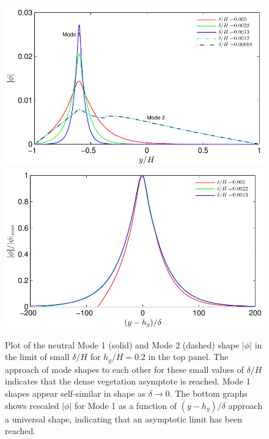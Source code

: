 \documentclass[12pt]{report}   %
\newcommand{\hg}{h_g}
\newcommand{\Rey}{{R}}
\newcommand{\Ndg}{\tilde{N}_g}
\begin{document}
\begin{figure}
{\includegraphics[scale=1.1]{Asymptotic_noshear}}\\
 \includegraphics[scale=1.1]{Asymptotic_noshear2}
\caption{
Plot of the neutral Mode 1 (solid) and Mode 2 (dashed) shape $|\phi|$ in the limit of small $\delta/H$ for $\hg/H=0.2$ in the top panel.
The approach of mode shapes to each other for these small values of $\delta/H$ indicates that the dense vegetation asymptote is reached. 
Mode 1 shapes appear self-similar in shape as $\delta\to 0$.
The bottom graphs shows rescaled $|\phi|$ for Mode 1 as a function of $(y-\hg)/\delta$ approach a universal shape, indicating that an asymptotic limit has been reached. 
}
\label{Asymptotic_mode}
\end{figure}
\end{document}
